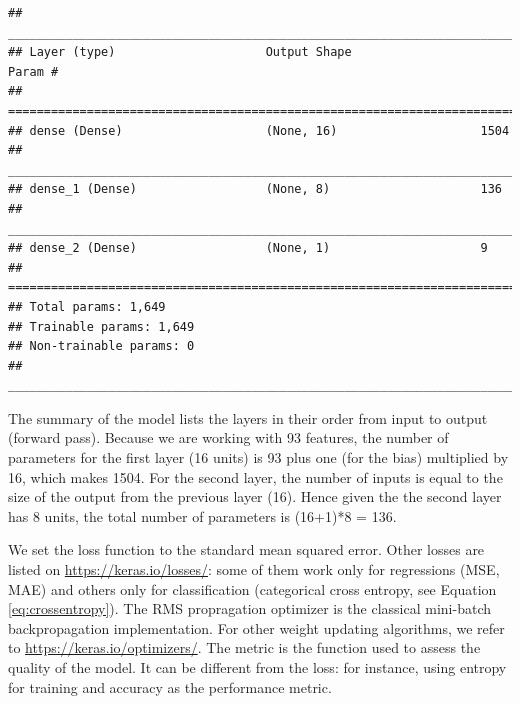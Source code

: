 \documentclass[]{krantz}
\makeatletter
\newenvironment{Shaded}{\begin{snugshade}}{\end{snugshade}}
\newcommand{\CommentTok}[1]{\textcolor[rgb]{0.37,0.37,0.37}{\textit{#1}}}
\newcommand{\DataTypeTok}[1]{\textcolor[rgb]{0.27,0.27,0.27}{#1}}
\newcommand{\KeywordTok}[1]{\textcolor[rgb]{0.27,0.27,0.27}{\textbf{#1}}}
\newcommand{\NormalTok}[1]{#1}
\newcommand{\OperatorTok}[1]{\textcolor[rgb]{0.43,0.43,0.43}{\textbf{#1}}}
\newcommand{\StringTok}[1]{\textcolor[rgb]{0.5,0.5,0.5}{#1}}
\newenvironment{kframe}{%
\medskip{}
\setlength{\fboxsep}{.8em}
 \def\at@end@of@kframe{}%
 \ifinner\ifhmode%
  \def\at@end@of@kframe{\end{minipage}}%
  \begin{minipage}{\columnwidth}%
 \fi\fi%
 \def\FrameCommand##1{\hskip\@totalleftmargin \hskip-\fboxsep
 \colorbox{shadecolor}{##1}\hskip-\fboxsep
     \hskip-\linewidth \hskip-\@totalleftmargin \hskip\columnwidth}%
 \MakeFramed {\advance\hsize-\width
   \@totalleftmargin\z@ \linewidth\hsize
   \@setminipage}}%
 {\par\unskip\endMakeFramed%
 \at@end@of@kframe}
\renewenvironment{Shaded}{\begin{kframe}}{\end{kframe}}
\theoremstyle{definition}
\theoremstyle{definition}
\theoremstyle{definition}
\theoremstyle{remark}
\makeatother
\begin{document}
\footnotesize

\begin{Shaded}
\end{Shaded}

\begin{verbatim}
## ___________________________________________________________________________
## Layer (type)                     Output Shape                  Param #     
## ===========================================================================
## dense (Dense)                    (None, 16)                    1504        
## ___________________________________________________________________________
## dense_1 (Dense)                  (None, 8)                     136         
## ___________________________________________________________________________
## dense_2 (Dense)                  (None, 1)                     9           
## ===========================================================================
## Total params: 1,649
## Trainable params: 1,649
## Non-trainable params: 0
## ___________________________________________________________________________
\end{verbatim}

\normalsize

The summary of the model lists the layers in their order from input to
output (forward pass). Because we are working with 93 features, the
number of parameters for the first layer (16 units) is 93 plus one (for
the bias) multiplied by 16, which makes 1504. For the second layer, the
number of inputs is equal to the size of the output from the previous
layer (16). Hence given the the second layer has 8 units, the total
number of parameters is (16+1)*8 = 136.

We set the loss function to the standard mean squared error. Other
losses are listed on \url{https://keras.io/losses/}: some of them work
only for regressions (MSE, MAE) and others only for classification
(categorical cross entropy, see Equation \eqref{eq:crossentropy}). The RMS
propragation optimizer is the classical mini-batch backpropagation
implementation. For other weight updating algorithms, we refer to
\url{https://keras.io/optimizers/}. The metric is the function used to
assess the quality of the model. It can be different from the loss: for
instance, using entropy for training and accuracy as the performance
metric.
\end{document}
